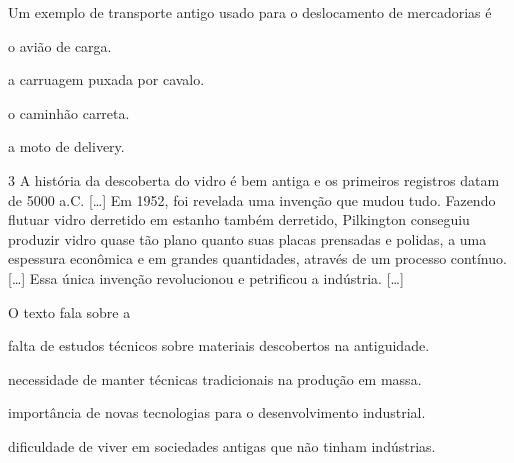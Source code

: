 
Um exemplo de transporte antigo usado para o deslocamento de mercadorias é

\begin{minipage}{0.5\textwidth}
\begin{escolha}
\item o avião de carga.

\item a carruagem puxada por cavalo.

\item o caminhão carreta.

\item a moto de delivery.
\end{escolha}
\end{minipage}


\num{3} A história da descoberta do vidro é bem antiga e os primeiros
registros datam de 5000 a.C. {[}\ldots{}{]} Em 1952, foi revelada uma invenção que
mudou tudo. Fazendo flutuar vidro derretido em estanho também derretido,
Pilkington conseguiu produzir vidro quase tão plano quanto suas placas
prensadas e polidas, a uma espessura econômica e em grandes quantidades,
através de um processo contínuo. {[}\ldots{}{]} Essa única invenção revolucionou e
petrificou a indústria. {[}\ldots{}{]}


O texto fala sobre a

\begin{escolha}
\item falta de estudos técnicos sobre materiais descobertos na antiguidade.

\item necessidade de manter técnicas tradicionais na produção em massa.

\item importância de novas tecnologias para o desenvolvimento industrial.

\item dificuldade de viver em sociedades antigas que não tinham indústrias.
\end{escolha}

